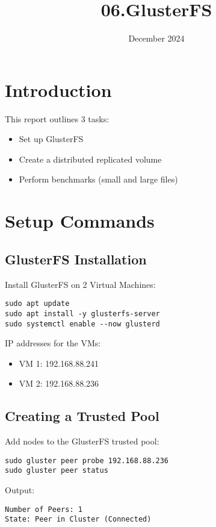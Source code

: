\documentclass[a4paper,12pt]{article}
\begin{document}
\title{06.GlusterFS}
\date{December 2024}
\maketitle

\section{Introduction}
This report outlines 3 tasks:
\begin{itemize}
    \item Set up GlusterFS
    \item Create a distributed replicated volume
    \item Perform benchmarks (small and large files)
\end{itemize}

\section{Setup Commands}

\subsection{GlusterFS Installation}
Install GlusterFS on 2 Virtual Machines:
\begin{lstlisting}
sudo apt update
sudo apt install -y glusterfs-server
sudo systemctl enable --now glusterd
\end{lstlisting}
IP addresses for the VMs:
\begin{itemize}
    \item VM 1: 192.168.88.241
    \item VM 2: 192.168.88.236
\end{itemize}

\subsection{Creating a Trusted Pool}
Add nodes to the GlusterFS trusted pool:
\begin{lstlisting}
sudo gluster peer probe 192.168.88.236
sudo gluster peer status
\end{lstlisting}
Output:
\begin{lstlisting}
Number of Peers: 1
State: Peer in Cluster (Connected)
\end{lstlisting}
\end{document}
